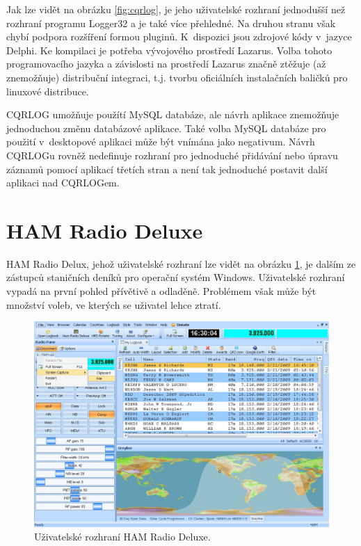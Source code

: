 Jak lze vidět na obrázku \ref{fig:cqrlog}, je jeho uživatelské rozhraní jednodušší než rozhraní programu Logger32 a je
také více přehledné. Na druhou stranu však chybí podpora rozšíření formou pluginů. K~dispozici jsou zdrojové kódy v~jazyce
Delphi. Ke kompilaci je potřeba vývojového prostředí Lazarus. %
Volba tohoto programovacího jazyka a závislosti na prostředí Lazarus
značně ztěžuje (až znemožňuje) distribuční integraci, t.j. tvorbu oficiálních instalačních baličků pro linuxové distribuce.

CQRLOG umožňuje použítí
MySQL databáze, ale návrh aplikace znemožňuje jednoduchou změnu databázové aplikace. Také volba MySQL databáze pro použití 
v~desktopové aplikaci může být vnímána jako negativum. Návrh CQRLOGu rovněž nedefinuje rozhraní pro jednoduché přidávání nebo úpravu
záznamů pomocí aplikací třetích stran a není tak jednoduché postavit další aplikaci nad CQRLOGem.

\section{HAM Radio Deluxe}

HAM Radio Delux, jehož uživatelské rozhraní lze vidět na obrázku \ref{fig:ham_radio_deluxe}, je dalším ze zástupců
staničních deníků pro operační systém Windows. Uživatelské rozhraní vypadá na první pohled přívětivě a odladěně.
Problémem však může být množství voleb, ve kterých se uživatel lehce ztratí.

\begin{figure}[h]
\centering
\includegraphics[trim=0cm 0cm 0cm 0cm, scale=0.33]{fig/hrd}
\caption{Uživatelské rozhraní HAM Radio Deluxe.}
\label{fig:ham_radio_deluxe}
\end{figure}

